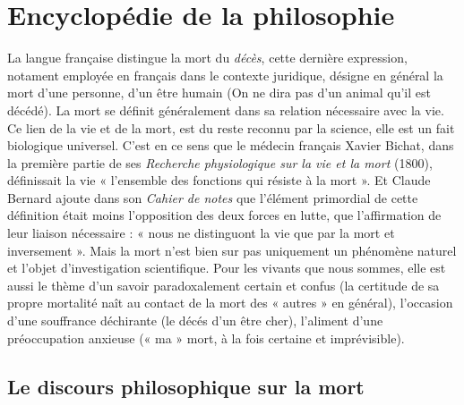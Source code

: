 

\section{Encyclopédie de la philosophie}

La langue française distingue la mort du {\it décès}, cette dernière expression, notament employée en français dans le contexte juridique, désigne en général la mort d'une personne, d'un être humain (On ne dira pas d'un animal qu'il est décédé). La mort se définit généralement dans sa relation nécessaire avec la vie. Ce lien de la vie et de la mort, est du reste reconnu par la science, elle est un fait biologique universel. C'est en ce sens que le médecin français Xavier Bichat, dans la première partie de ses {\it Recherche physiologique sur la vie et la mort} (1800), définissait la vie « l'ensemble des fonctions qui résiste à la mort ». Et Claude Bernard ajoute dans son {\it Cahier de notes} que l'élément primordial de cette définition était moins l'opposition des deux forces en lutte, que l'affirmation de leur liaison nécessaire : « nous ne distinguont la vie que par la mort et inversement ». Mais la mort n'est bien sur pas uniquement un phénomène naturel et l'objet d'investigation scientifique. Pour les vivants que nous sommes, elle est aussi le thème d'un savoir paradoxalement certain et confus (la certitude de sa propre mortalité naît au contact de la mort des « autres » en général), l'occasion d'une souffrance déchirante (le décés d'un être cher), l'aliment d'une préoccupation anxieuse (« ma » mort, à la fois certaine et imprévisible).

\subsection{Le discours philosophique sur la mort}

